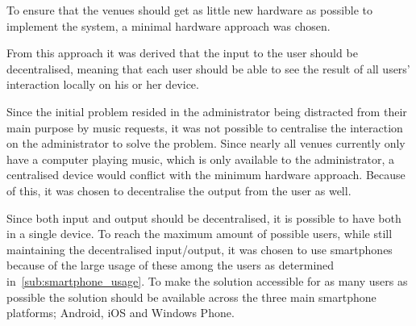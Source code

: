 To ensure that the venues should get as little new hardware as possible to implement the system, a minimal hardware approach was chosen.

From this approach it was derived that the input to the user should be decentralised, meaning that each user should be able to see the result of all users' interaction locally on his or her device.

Since the initial problem resided in the administrator being distracted from their main purpose by music requests, it was not possible to centralise the interaction on the administrator to solve the problem. Since nearly all venues currently only have a computer playing music, which is only available to the administrator, a centralised device would conflict with the minimum hardware approach. Because of this, it was chosen to decentralise the output from the user as well.

Since both input and output should be decentralised, it is possible to have both in a single device.
To reach the maximum amount of possible users, while still maintaining the decentralised input/output, it was chosen to use smartphones because of the large usage of these among the users as determined in~\cref{sub:smartphone_usage}. To make the solution accessible for as many users as possible the solution should be available across the three main smartphone platforms; Android, iOS and Windows Phone.
